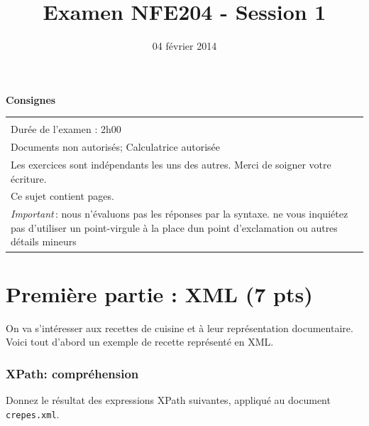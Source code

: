 \documentclass[9pt,a4paper]{article}
\begin{document}
\title{Examen NFE204 - Session 1}
\date{04 février 2014}

\maketitle

\begin{center}
{\bf \Large Consignes}\\
\begin{tabular}{| p{15cm} |}
\hline
\\
Dur\'ee de l'examen : 2h00\\
Documents non autoris\'es;  Calculatrice autoris\'ee\\

Les exercices sont ind\'ependants les uns des autres. Merci de soigner votre \'ecriture.\\
Ce sujet contient \pageref{LastPage} pages.\\


\textit{Important}\,: nous n'évaluons pas les réponses par la syntaxe. ne vous
inquiétez pas d'utiliser un point-virgule à la place dun point d'exclamation ou
autres détails mineurs
\\
\hline
\end{tabular}
\end{center}

\section*{Première partie : XML (7 pts)}

On va s'intéresser aux recettes de cuisine et à leur représentation documentaire. Voici tout
d'abord un exemple de recette représenté en XML.

\vspace{-0.05cm} 



\subsubsection*{XPath: compréhension}

Donnez le résultat des expressions XPath suivantes, appliqué au document \texttt{crepes.xml}.
\end{document}
